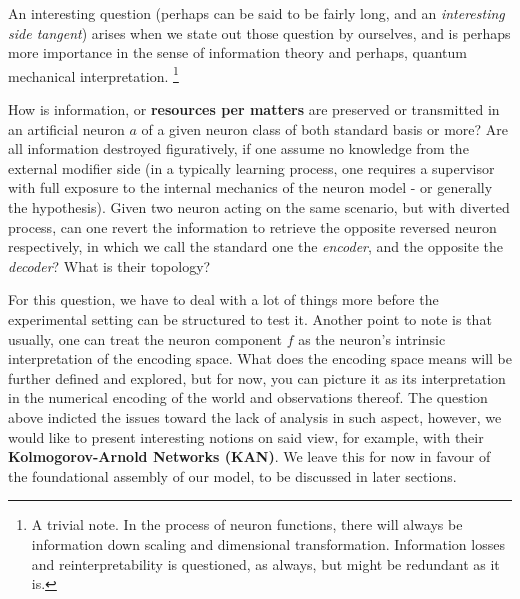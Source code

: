 An interesting question (perhaps can be said to be fairly long, and an \textit{interesting side tangent}) arises when we state out those question by ourselves, and is perhaps more importance in the sense of information theory and perhaps, quantum mechanical interpretation. \footnote{A trivial note. In the process of neuron functions, there will always be information down scaling and dimensional transformation. Information losses and reinterpretability is questioned, as always, but might be redundant as it is. }
\begin{question}
    How is information, or \textbf{resources per matters} are preserved or transmitted in an artificial neuron $a$ of a given neuron class of both standard basis or more? Are all information destroyed figuratively, if one assume no knowledge from the external modifier side (in a typically learning process, one requires a supervisor with full exposure to the internal mechanics of the neuron model - or generally the hypothesis). Given two neuron acting on the same scenario, but with diverted process, can one revert the information to retrieve the opposite reversed neuron respectively, in which we call the standard one the \textit{encoder}, and the opposite the \textit{decoder}? What is their topology?
\end{question}
For this question, we have to deal with a lot of things more before the experimental setting can be structured to test it. Another point to note is that usually, one can treat the neuron component $f$ as the neuron's intrinsic interpretation of the encoding space. What does the encoding space means will be further defined and explored, but for now, you can picture it as its interpretation in the numerical encoding of the world and observations thereof. The question above indicted the issues toward the lack of analysis in such aspect, however, we would like to present interesting notions on said view, for example, \cite{liu2025kankolmogorovarnoldnetworks} with their \textbf{Kolmogorov-Arnold Networks (KAN)}. We leave this for now in favour of the foundational assembly of our model, to be discussed in later sections.  

